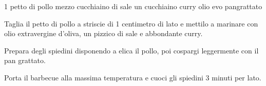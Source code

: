 \begin{ingreds}
	1 petto di pollo 
	mezzo cucchiaino di sale
	un cucchiaino curry 
	olio evo 
	pangrattato 
\end{ingreds}

\begin{method}
Taglia il petto di pollo a striscie di 1 centimetro di lato e mettilo a marinare con olio extravergine d'oliva, un pizzico di sale e abbondante curry.

Prepara degli spiedini disponendo a elica il pollo, poi cospargi leggermente con il pan grattato.

Porta il barbecue alla massima temperatura e cuoci gli spiedini 3 minuti per lato.
\end {method}
